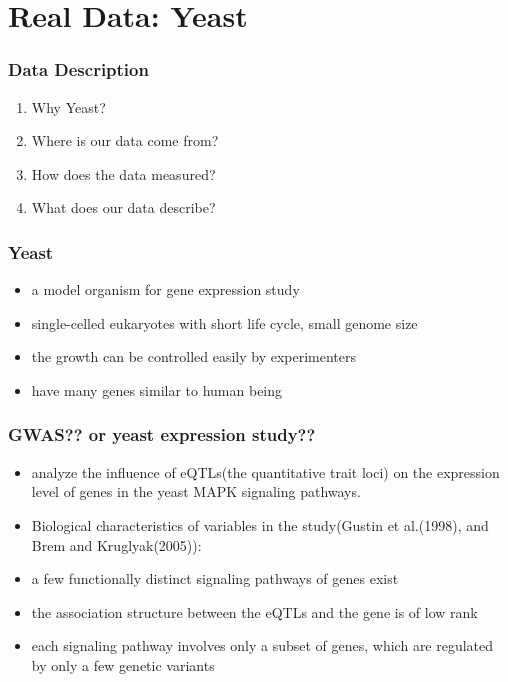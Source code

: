 \section{Real Data: Yeast}
\begin{frame}
    \sectionpage
\end{frame}

\begin{frame}\frametitle{Data Description}
    \begin{enumerate}
        \item Why Yeast?
        \item Where is our data come from? 
        \item How does the data measured? 
        \item What does our data describe? 
    \end{enumerate}
\end{frame}

\begin{frame}\frametitle{Yeast}
    \begin{itemize}
        \item a model organism for gene expression study
        \item single-celled eukaryotes with short life cycle, small genome size
        \item the growth can be controlled easily by experimenters
        \item have many genes similar to human being
    \end{itemize}
\end{frame}

\begin{frame}\frametitle{GWAS?? or yeast expression study??}
    \begin{itemize}
        \item analyze the influence of eQTLs(the quantitative trait loci) on the expression level of genes in the yeast MAPK signaling pathways. 
        \item Biological characteristics of variables in the study(Gustin et al.(1998), and Brem and Kruglyak(2005)):
        \item a few functionally distinct signaling pathways of genes exist
        \item the association structure between the eQTLs and the gene is of low rank
        \item each signaling pathway involves only a subset of genes, which are regulated by only a few genetic variants
    \end{itemize}
\end{frame}

